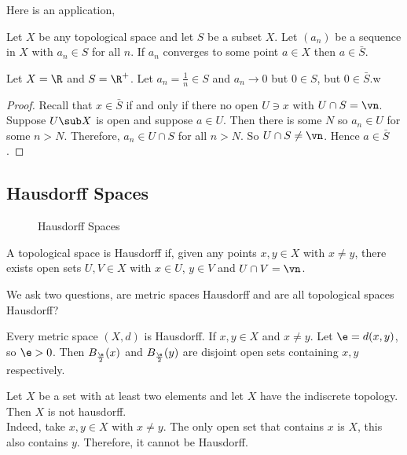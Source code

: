 \noindent
Here is an application,
\begin{ncor}
   Let $X$ be any topological space and let $S$ be a subset $X$. Let $(a_n)$ be a sequence in $X$ with $a_n \in S$ for all $n$. If $a_n$ converges to some point $a \in X$ then $a \in \bar S$.
\end{ncor}
\begin{eg}
  Let $X = \R$ and $S = \R^+$. Let $a_n = \frac{1}{n} \in S$ and $a_n \to 0$ but $0 \in S$, but $0 \in \bar S$.w
\end{eg}

\begin{proof}
  Recall that $x \in \bar S$ if and only if there no open $U \ni x$ with $U \cap S = \vn$. Suppose $U \sub X$ is open and suppose $a \in U$. Then there is some $N$ so $a_n \in U$ for some $n > N$. Therefore, $a_n \in U \cap S$ for all $n > N$. So $U \cap S \ne \vn$. Hence $a \in \bar S$.
\end{proof}
\newpage
\subsection{Hausdorff Spaces}
\begin{wrapfigure}{r}{0.4\textwidth}
  \centering
  \resizebox{0.4\textwidth}{!}{}
  \caption{Hausdorff Spaces}
  \vspace{-20pt}
\end{wrapfigure}
\begin{ndefi}[Hausdorff]
  A topological space is Hausdorff if, given any points $x, y \in X$ with $x \ne y$, there exists open sets $U, V \in X$ with $x \in U$, $y \in V$ and $U \cap V = \vn$.
\end{ndefi}

We ask two questions, are metric spaces Hausdorff and are all topological spaces Hausdorff?
\begin{eg}
  Every metric space $(X, d)$ is Hausdorff. If $x, y \in X$ and $x \ne y$. Let $\e = d(x, y)$, so $\e > 0$. Then $B_{\frac{\e}{2}}(x)$ and $B_{\frac{\e}{2}}(y)$ are disjoint open sets containing $x, y$ respectively.
\end{eg}

\begin{eg}
  Let $X$ be a set with at least two elements and let $X$ have the indiscrete topology. Then $X$ is not hausdorff.\\
  Indeed, take $x, y \in X$ with $x \ne y$. The only open set that contains $x$ is $X$, this also contains $y$. Therefore, it cannot be Hausdorff.
\end{eg}

